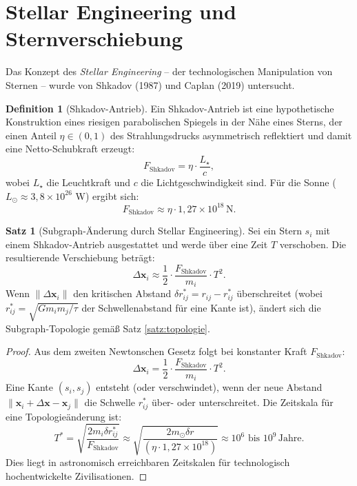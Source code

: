 ﻿\documentclass[a4paper,12pt]{report}
\theoremstyle{definition}
\newtheorem{definition}{Definition}
\newtheorem{satz}{Satz}
\begin{document}
\section{Stellar Engineering und Sternverschiebung}

Das Konzept des \emph{Stellar Engineering} -- der technologischen Manipulation von Sternen -- wurde von Shkadov (1987) und Caplan (2019) untersucht.

\begin{definition}[Shkadov-Antrieb]
Ein Shkadov-Antrieb ist eine hypothetische Konstruktion eines riesigen parabolischen Spiegels in der Nähe eines Sterns, der einen Anteil $\eta \in (0,1)$ des Strahlungsdrucks asymmetrisch reflektiert und damit eine Netto-Schubkraft erzeugt:
\[
F_\mathrm{Shkadov} = \eta \cdot \frac{L_\star}{c},
\]
wobei $L_\star$ die Leuchtkraft und $c$ die Lichtgeschwindigkeit sind. Für die Sonne ($L_\odot \approx 3{,}8 \times 10^{26}$ W) ergibt sich:
\[
F_\mathrm{Shkadov} \approx \eta \cdot 1{,}27 \times 10^{18} \, \mathrm{N}.
\]
\end{definition}

\begin{satz}[Subgraph-Änderung durch Stellar Engineering]
\label{satz:stellar}
Sei ein Stern $s_i$ mit einem Shkadov-Antrieb ausgestattet und werde über eine Zeit $T$ verschoben. Die resultierende Verschiebung beträgt:
\[
\Delta \mathbf{x}_i \approx \frac{1}{2} \cdot \frac{F_\mathrm{Shkadov}}{m_i} \cdot T^2.
\]
Wenn $\|\Delta \mathbf{x}_i\|$ den kritischen Abstand $\delta r_{ij}^* = r_{ij} - r_{ij}^*$ überschreitet (wobei $r_{ij}^* = \sqrt{G m_i m_j/\tau}$ der Schwellenabstand für eine Kante ist), ändert sich die Subgraph-Topologie gemäß Satz \ref{satz:topologie}.
\end{satz}

\begin{proof}
Aus dem zweiten Newtonschen Gesetz folgt bei konstanter Kraft $F_\mathrm{Shkadov}$:
\[
\Delta \mathbf{x}_i = \frac{1}{2} \cdot \frac{F_\mathrm{Shkadov}}{m_i} \cdot T^2.
\]
Eine Kante $(s_i, s_j)$ entsteht (oder verschwindet), wenn der neue Abstand $\|\mathbf{x}_i + \Delta \mathbf{x} - \mathbf{x}_j\|$ die Schwelle $r_{ij}^*$ über- oder unterschreitet. Die Zeitskala für eine Topologieänderung ist:
\[
T^* = \sqrt{\frac{2 m_i \delta r_{ij}^*}{F_\mathrm{Shkadov}}} \approx \sqrt{\frac{2 m_\odot \delta r}{(\eta \cdot 1{,}27 \times 10^{18})}} \approx 10^6 \text{ bis } 10^9 \, \text{Jahre}.
\]
Dies liegt in astronomisch erreichbaren Zeitskalen für technologisch hochentwickelte Zivilisationen.
\end{proof}
\end{document}
